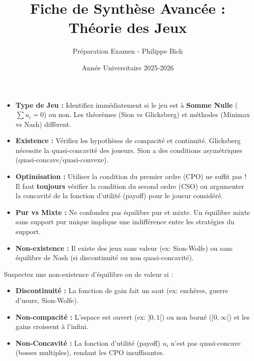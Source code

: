 \documentclass[10pt,a4paper]{article}
\title{\textbf{Fiche de Synthèse Avancée : Théorie des Jeux}}
\author{Préparation Examen - Philippe Bich}
\date{Année Universitaire 2025-2026}
\begin{document}
\maketitle

\begin{tcolorbox}[colback=red!5,colframe=myred,title=\textbf{Conseils Stratégiques \& Dangers (À lire en premier !)}]
\begin{itemize}[leftmargin=*]
    \item \textbf{Type de Jeu :} Identifiez immédiatement si le jeu est à \textbf{Somme Nulle} ($\sum u_i = 0$) ou non. Les théorèmes (Sion vs Glicksberg) et méthodes (Minimax vs Nash) diffèrent.
    \item \textbf{Existence :} Vérifiez les hypothèses de compacité et continuité. Glicksberg nécessite la quasi-concavité des joueurs. Sion a des conditions asymétriques (quasi-concave/quasi-convexe).
    \item \textbf{Optimisation :} Utiliser la condition du premier ordre (CPO) ne suffit pas ! Il faut \textbf{toujours} vérifier la condition du second ordre (CSO) ou argumenter la concavité de la fonction d'utilité (payoff) pour le joueur considéré.
    \item \textbf{Pur vs Mixte :} Ne confondez pas équilibre pur et mixte. Un équilibre mixte sans support pur unique implique une indifférence entre les stratégies du support.
    \item \textbf{Non-existence :} Il existe des jeux sans valeur (ex: Sion-Wolfe) ou sans équilibre de Nash (si discontinuité ou non quasi-concavité).
\end{itemize}
\begin{tcolorbox}[colback=orange!10,title=Méthodologie : Détecter la Non-Existence]
Suspectez une non-existence d'équilibre ou de valeur si :
\begin{itemize}
    \item \textbf{Discontinuité :} La fonction de gain fait un saut (ex: enchères, guerre d'usure, Sion-Wolfe).
    \item \textbf{Non-compacité :} L'espace est ouvert (ex: $]0,1[$) ou non borné ($[0, \infty[$) et les gains croissent à l'infini.
    \item \textbf{Non-Concavité :} La fonction d'utilité (payoff) $u_i$ n'est pas quasi-concave (bosses multiples), rendant les CPO insuffisantes.
\end{itemize}
\end{tcolorbox}
\end{tcolorbox}
\end{document}
